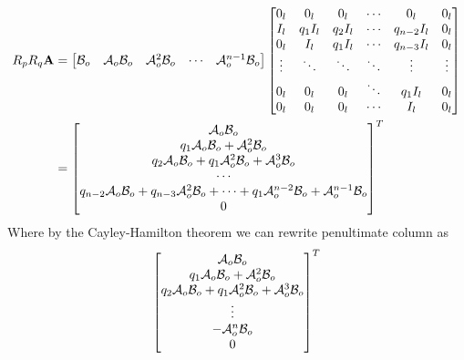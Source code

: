 \begin{equation*}
    \begin{split}
        R_pR_q\mathbf{A} &= 
        \begin{bmatrix}
            \mathcal{B}_o & \mathcal{A}_o\mathcal{B}_o & \mathcal{A}^{2}_o\mathcal{B}_o & \cdots & \mathcal{A}^{n-1}_o\mathcal{B}_o \\
        \end{bmatrix}
        \begin{bmatrix}
            0_l & 0_l & 0_l & \cdots & 0_l & 0_l \\
            I_l & q_1I_l & q_2I_l & \cdots & q_{n-2}I_l & 0_l \\ 
            0_l & I_l & q_1I_l & \cdots & q_{n-3}I_l & 0_l \\ 
            \vdots & \ddots & \ddots & \ddots & \vdots & \vdots \\
            0_l & 0_l & 0_l & \ddots & q_1I_l & 0_l \\
            0_l & 0_l & 0_l & \cdots & I_l & 0_l \\
        \end{bmatrix} \\
        &= 
        \begin{bmatrix}
            \mathcal{A}_o\mathcal{B}_o \\ q_1\mathcal{A}_o\mathcal{B}_o + \mathcal{A}^2_o\mathcal{B}_o \\ q_2\mathcal{A}_o\mathcal{B}_o + q_1\mathcal{A}^2_o\mathcal{B}_o + \mathcal{A}^3_o\mathcal{B}_o \\ \cdots \\ q_{n-2}\mathcal{A}_o\mathcal{B}_o + q_{n-3}\mathcal{A}^2_o\mathcal{B}_o + \cdots + q_1\mathcal{A}^{n-2}_o\mathcal{B}_o + \mathcal{A}^{n-1}_o\mathcal{B}_o \\ 0 \\      
        \end{bmatrix}^T
    \end{split}
\end{equation*}
Where by the Cayley-Hamilton theorem we can rewrite penultimate column as
\begin{equation*}
    \begin{bmatrix}
            \mathcal{A}_o\mathcal{B}_o \\ q_1\mathcal{A}_o\mathcal{B}_o + \mathcal{A}^2_o\mathcal{B}_o \\ q_2\mathcal{A}_o\mathcal{B}_o + q_1\mathcal{A}^2_o\mathcal{B}_o + \mathcal{A}^3_o\mathcal{B}_o \\ \vdots \\ -\mathcal{A}^n_o\mathcal{B}_o \\ 0 \\      
        \end{bmatrix}^T
\end{equation*}

